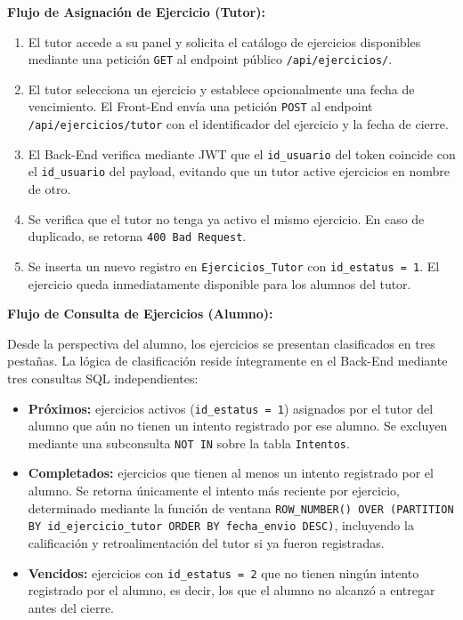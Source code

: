 \textbf{Flujo de Asignación de Ejercicio (Tutor):}
\begin{enumerate}
    \item El tutor accede a su panel y solicita el catálogo de ejercicios
    disponibles mediante una petición \texttt{GET} al endpoint público
    \texttt{/api/ejercicios/}.
    \item El tutor selecciona un ejercicio y establece opcionalmente una
    fecha de vencimiento. El Front-End envía una petición \texttt{POST}
    al endpoint \texttt{/api/ejercicios/tutor} con el identificador del
    ejercicio y la fecha de cierre.
    \item El Back-End verifica mediante JWT que el \texttt{id\_usuario}
    del token coincide con el \texttt{id\_usuario} del payload, evitando
    que un tutor active ejercicios en nombre de otro.
    \item Se verifica que el tutor no tenga ya activo el mismo ejercicio.
    En caso de duplicado, se retorna \texttt{400 Bad Request}.
    \item Se inserta un nuevo registro en \texttt{Ejercicios\_Tutor} con
    \texttt{id\_estatus = 1}. El ejercicio queda inmediatamente disponible
    para los alumnos del tutor.
\end{enumerate}

\textbf{Flujo de Consulta de Ejercicios (Alumno):}

Desde la perspectiva del alumno, los ejercicios se presentan clasificados
en tres pestañas. La lógica de clasificación reside íntegramente en el
Back-End mediante tres consultas SQL independientes:

\begin{itemize}
    \item \textbf{Próximos:} ejercicios activos (\texttt{id\_estatus = 1})
    asignados por el tutor del alumno que aún no tienen un intento
    registrado por ese alumno. Se excluyen mediante una subconsulta
    \texttt{NOT IN} sobre la tabla \texttt{Intentos}.

    \item \textbf{Completados:} ejercicios que tienen al menos un intento
    registrado por el alumno. Se retorna únicamente el intento más reciente
    por ejercicio, determinado mediante la función de ventana
    \texttt{ROW\_NUMBER() OVER (PARTITION BY id\_ejercicio\_tutor ORDER BY
    fecha\_envio DESC)}, incluyendo la calificación y retroalimentación
    del tutor si ya fueron registradas.

    \item \textbf{Vencidos:} ejercicios con \texttt{id\_estatus = 2} que
    no tienen ningún intento registrado por el alumno, es decir, los que
    el alumno no alcanzó a entregar antes del cierre.
\end{itemize}

